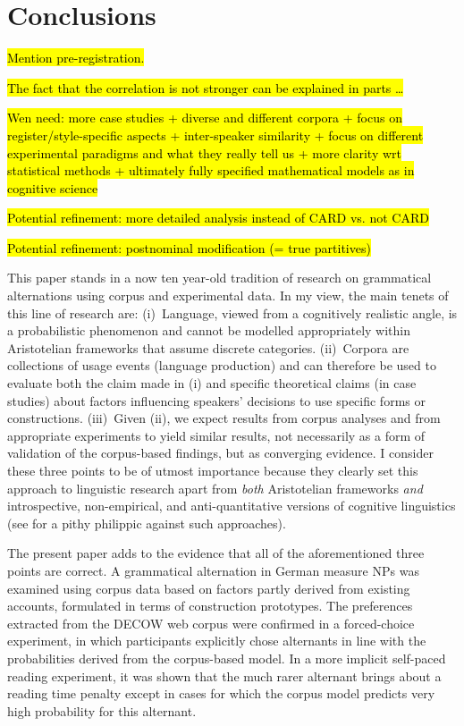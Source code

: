\section{Conclusions}
\label{sec:conclusion}

\hl{Mention pre-registration.}

\hl{The fact that the correlation is not stronger can be explained in parts \ldots}

\hl{Wen need: more case studies +  diverse and different corpora + focus on register/style-specific aspects + inter-speaker similarity + focus on different experimental paradigms and what they really tell us + more clarity wrt statistical methods + ultimately fully specified mathematical models as in cognitive science}

\hl{Potential refinement: more detailed analysis instead of CARD vs. not CARD}

\hl{Potential refinement: postnominal modification (= true partitives)}

This paper stands in a now ten year-old tradition of research on grammatical alternations using corpus and experimental data.
In my view, the main tenets of this line of research are:
(i)~Language, viewed from a cognitively realistic angle, is a probabilistic phenomenon and cannot be modelled appropriately within Aristotelian frameworks that assume discrete categories.
(ii)~Corpora are collections of usage events (language production) and can therefore be used to evaluate both the claim made in (i) and specific theoretical claims (in case studies) about factors influencing speakers' decisions to use specific forms or constructions.
(iii)~Given (ii), we expect results from corpus analyses and from appropriate experiments to yield similar results, not necessarily as a form of validation of the corpus-based findings, but as converging evidence.
I consider these three points to be of utmost importance because they clearly set this approach to linguistic research apart from \textit{both} Aristotelian frameworks \textit{and} introspective, non-empirical, and anti-quantitative versions of cognitive linguistics (see \citealp{Dabrowska2016} for a pithy philippic against such approaches).

The present paper adds to the evidence that all of the aforementioned three points are correct.
A grammatical alternation in German measure NPs was examined using corpus data based on factors partly derived from existing accounts, formulated in terms of construction prototypes.
The preferences extracted from the DECOW web corpus were confirmed in a forced-choice experiment, in which participants explicitly chose alternants in line with the probabilities derived from the corpus-based model.
In a more implicit self-paced reading experiment, it was shown that the much rarer alternant brings about a reading time penalty except in cases for which the corpus model predicts very high probability for this alternant.

